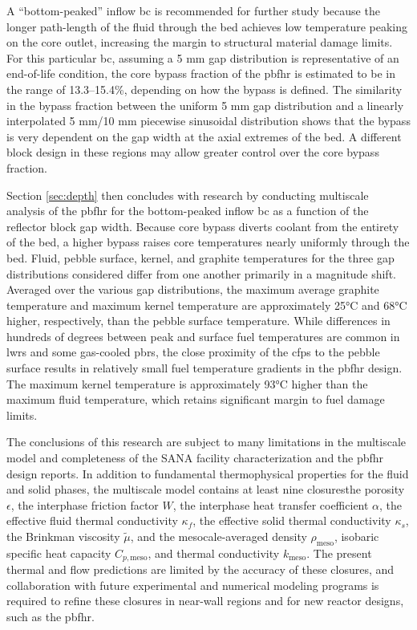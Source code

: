 A ``bottom-peaked'' inflow \gls{bc} is recommended for further study because the longer path-length of the fluid through the bed achieves low temperature peaking on the core outlet, increasing the margin to structural material damage limits. For this particular \gls{bc}, assuming a 5 \si{\milli\meter} gap distribution is representative of an end-of-life condition, the core bypass fraction of the \gls{pbfhr} is estimated to be in the range of 13.3--15.4\%, depending on how the bypass is defined. The similarity in the bypass fraction between the uniform 5 \si{\milli\meter} gap distribution and a linearly interpolated 5 \si{\milli\meter}/10 \si{\milli\meter} piecewise sinusoidal distribution shows that the bypass is very dependent on the gap width at the axial extremes of the bed. A different block design in these regions may allow greater control over the core bypass fraction.

Section \ref{sec:depth} then concludes with research by conducting multiscale analysis of the \gls{pbfhr} for the bottom-peaked inflow \gls{bc} as a function of the reflector block gap width. Because core bypass diverts coolant from the entirety of the bed, a higher bypass raises core temperatures nearly uniformly through the bed. Fluid, pebble surface, kernel, and graphite temperatures for the three gap distributions considered differ from one another primarily in a magnitude shift. Averaged over the various gap distributions, the maximum average graphite temperature and maximum kernel temperature are approximately 25\si{\celsius} and 68\si{\celsius} higher, respectively, than the pebble surface temperature. While differences in hundreds of degrees between peak and surface fuel temperatures are common in \glspl{lwr} and some gas-cooled \glspl{pbr}, the close proximity of the \glspl{cfp} to the pebble surface results in relatively small fuel temperature gradients in the \gls{pbfhr} design. The maximum kernel temperature is approximately 93\si{\celsius} higher than the maximum fluid temperature, which retains significant margin to fuel damage limits.

The conclusions of this research are subject to many limitations in the multiscale model and completeness of the SANA facility characterization and the \gls{pbfhr} design reports. In addition to fundamental thermophysical properties for the fluid and solid phases, the multiscale model contains at least nine closures\mdash the porosity \(\epsilon\), the interphase friction factor \(W\), the interphase heat transfer coefficient \(\alpha\), the effective fluid thermal conductivity \(\kappa_f\), the effective solid thermal conductivity \(\kappa_s\), the Brinkman viscosity \(\tilde{\mu}\), and the mesocale-averaged density \(\rho_\text{meso}\), isobaric specific heat capacity \(C_{p,\text{meso}}\), and thermal conductivity \(k_\text{meso}\). The present thermal and flow predictions are limited by the accuracy of these closures, and collaboration with future experimental and numerical modeling programs is required to refine these closures in near-wall regions and for new reactor designs, such as the \gls{pbfhr}. 

